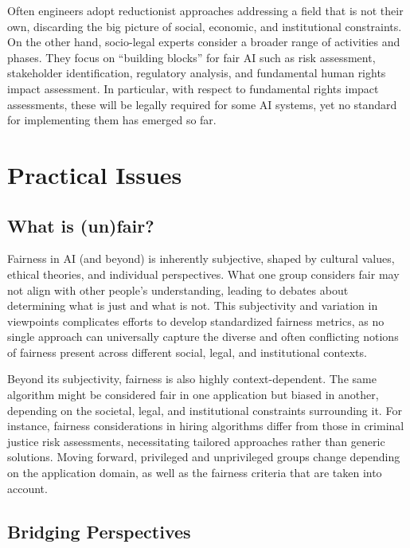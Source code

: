 \documentclass[12pt,a4paper,openright,twoside]{book}
\begin{document}
Often engineers adopt reductionist approaches addressing a field that is not their own, discarding the big picture of social, economic, and institutional constraints.
%
On the other hand, socio-legal experts consider a broader range of activities and phases.
%
They focus on ``building blocks'' for fair \ac{AI} such as risk assessment, stakeholder identification, regulatory analysis, and fundamental human rights impact assessment.
%
In particular, with respect to fundamental rights impact assessments, these will be legally required for some \ac{AI} systems, yet no standard for implementing them has emerged so far.


\section{Practical Issues}

\subsection{What is (un)fair?}


Fairness in \ac{AI} (and beyond) is inherently subjective, shaped by cultural values, ethical theories, and individual perspectives.
%
What one group considers fair may not align with other people’s understanding, leading to debates about determining what is just and what is not.
%
This subjectivity and variation in viewpoints complicates efforts to develop standardized fairness metrics, as no single approach can universally capture the diverse and often conflicting notions of fairness present across different social, legal, and institutional contexts.


Beyond its subjectivity, fairness is also highly context-dependent. 
%
The same algorithm might be considered fair in one application but biased in another, depending on the societal, legal, and institutional constraints surrounding it.
%
For instance, fairness considerations in hiring algorithms differ from those in criminal justice risk assessments, necessitating tailored approaches rather than generic solutions.
%
Moving forward, privileged and unprivileged groups change depending on the application domain, as well as the fairness criteria that are taken into account.

\subsection{Bridging Perspectives}
\end{document}
